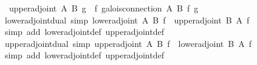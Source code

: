 \begin{isabellebody}
\ \ {}upper{}adjoint\ A\ B\ g\ {}\ {}f{}\ galois{}connection\ A\ B\ f\ g{}\isanewline
\isanewline
{}\isamarkupfalse%
\ lower{}adjoint{}dual\ {}simp{}{}\ {}lower{}adjoint\ {}A{}{}\ {}B{}{}\ f\ {}\ upper{}adjoint\ B\ A\ f{}\isanewline
%
\isadelimproof
\ \ %
\endisadelimproof
%
\isatagproof
{}\isamarkupfalse%
\ {}simp\ add{}\ lower{}adjoint{}def\ upper{}adjoint{}def{}%
\endisatagproof
{\isafoldproof}%
%
\isadelimproof
\isanewline
%
\endisadelimproof
\isanewline
{}\isamarkupfalse%
\ upper{}adjoint{}dual\ {}simp{}{}\ {}upper{}adjoint\ {}A{}{}\ {}B{}{}\ f\ {}\ lower{}adjoint\ B\ A\ f{}\isanewline
%
\isadelimproof
\ \ %
\endisadelimproof
%
\isatagproof
{}\isamarkupfalse%
\ {}simp\ add{}\ lower{}adjoint{}def\ upper{}adjoint{}def{}%

\end{isabellebody}
